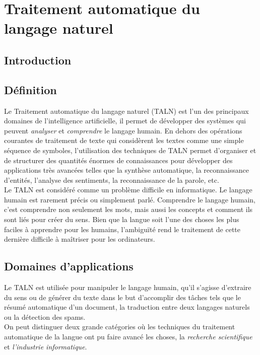 \documentclass{report}
\begin{document}
% 
\tableofcontents
{}

\chapter{Traitement automatique du langage naturel} 
\newpage
\section{Introduction}

\section{Définition}
Le Traitement automatique du langage naturel (TALN) est l'un des principaux domaines de l'intelligence artificielle, il permet de développer des systèmes qui peuvent \emph{analyser} et \emph{comprendre} le langage humain. En dehors des opérations courantes de traitement de texte qui considèrent les textes comme une simple séquence de symboles, l'utilisation des techniques de TALN permet d'organiser et de structurer des quantités énormes de connaissances pour développer des applications très avancées telles que la synthèse automatique, la reconnaissance d'entités, l'analyse des sentiments, la reconnaissance de la parole, etc.\\
Le TALN est considéré comme un problème difficile en informatique. Le langage humain est rarement précis ou simplement parlé. Comprendre le langage humain, c'est comprendre non seulement les mots, mais aussi les concepts et comment ils sont liés pour créer du sens. Bien que la langue soit l'une des choses les plus faciles à apprendre pour les humains, l'ambiguïté rend le traitement de cette dernière difficile à maîtriser pour les ordinateurs.


\section{Domaines d'applications}
Le TALN est utilisée pour manipuler le langage humain, qu'il s'agisse d'extraire du sens ou de générer du texte dans le but d'accomplir des tâches tels que le résumé automatique d'un document, la traduction entre deux langages naturels ou la détection des spams.\\
On peut distinguer deux grande catégories où les techniques du traitement automatique de la langue ont pu faire avancé les choses, la \emph{recherche scientifique} et \emph{l'industrie informatique}.\\
\end{document}
